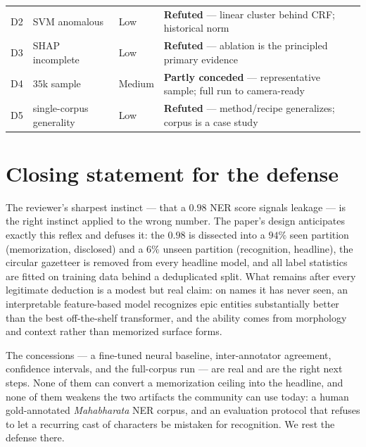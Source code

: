 \documentclass[11pt]{article}
\begin{document}
\begin{table}[!htbp]
\begin{tabularx}{\textwidth}{@{}l l l X@{}}
D2 & SVM anomalous                     & Low    & \textbf{Refuted} --- linear cluster behind CRF; historical norm \\
D3 & SHAP incomplete                   & Low    & \textbf{Refuted} --- ablation is the principled primary evidence \\
D4 & $35$k sample                      & Medium & \textbf{Partly conceded} --- representative sample; full run to camera-ready \\
D5 & single-corpus generality          & Low    & \textbf{Refuted} --- method/recipe generalizes; corpus is a case study \\
\bottomrule
\end{tabularx}
\end{table}

\section{Closing statement for the defense}
The reviewer's sharpest instinct --- that a $0.98$ NER score signals leakage --- is
the right instinct applied to the wrong number. The paper's design anticipates
exactly this reflex and defuses it: the $0.98$ is dissected into a $94\%$ seen
partition (memorization, disclosed) and a $6\%$ unseen partition (recognition,
headline), the circular gazetteer is removed from every headline model, and all
label statistics are fitted on training data behind a deduplicated split. What
remains after every legitimate deduction is a modest but real claim: on names it
has never seen, an interpretable feature-based model recognizes epic entities
substantially better than the best off-the-shelf transformer, and the ability
comes from morphology and context rather than memorized surface forms.

The concessions --- a fine-tuned neural baseline, inter-annotator agreement,
confidence intervals, and the full-corpus run --- are real and are the right
next steps. None of them can convert a memorization ceiling into the headline, and
none of them weakens the two artifacts the community can use today: a
human gold-annotated \emph{Mahabharata} NER corpus, and an evaluation protocol
that refuses to let a recurring cast of characters be mistaken for recognition.
We rest the defense there.
\end{document}

